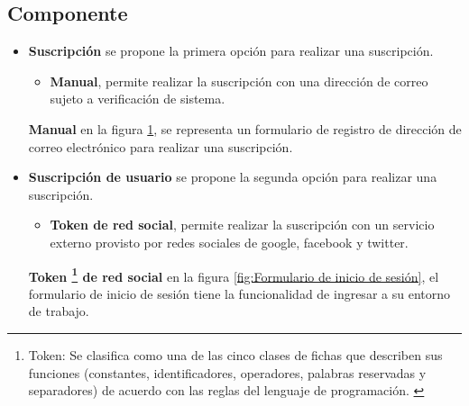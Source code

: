 \subsection{Componente}

\begin{itemize}

\item \textbf{Suscripción}
se propone la primera opción para realizar una suscripción.

\begin{itemize}

\item \textbf{Manual}, permite realizar la suscripción con una dirección de
correo sujeto a verificación de sistema.

\end{itemize}

\textbf{Manual} en la figura \ref{fig:Ventana emergente de suscripción}, se
representa un formulario de registro de dirección de correo electrónico para
realizar una suscripción. 

\begin{figure}[!ht]
	\centering
	\label{fig:Ventana emergente de suscripción}
\end{figure}

\item \textbf{Suscripción de usuario}
se propone la segunda opción para realizar una suscripción.

\begin{itemize}

\item \textbf{Token de red social}, permite realizar la suscripción con un
servicio externo provisto por redes sociales de google, facebook y twitter.

\end{itemize}

\textbf{Token \footnote{Token: Se clasifica como una de las cinco clases de
fichas que describen sus funciones (constantes, identificadores, operadores,
palabras reservadas y separadores) de acuerdo con las reglas del lenguaje de
programación. \cite{token}} de red social} en la figura \ref{fig:Formulario
de inicio de sesión}, el formulario de inicio de sesión tiene la funcionalidad
de ingresar a su entorno de trabajo.

\begin{figure}[H]
	\centering
	\label{fig:Formulario de inicio de sesión}
\end{figure}


\end{itemize}
